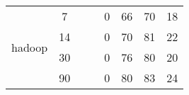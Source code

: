 \begin{wraptable}{r}{3in}
\begin{tabular}{c@{~}c|c@{~}c@{~}c|c@{~}c@{~}c}
\multirow{4}{*}{hadoop}                              & 7                                                    & \cellcolor[gray]{0.8}{0}         & \cellcolor[gray]{0.8}{0}       & 0       & 66         & 70       & 18      \\ \cline{2-2}
                              & 14                                                   & \cellcolor[gray]{0.8}{0}         & \cellcolor[gray]{0.8}{0}       & 0       & 70         & 81       & 22      \\ \cline{2-2}
                              & 30                                                   & \cellcolor[gray]{0.8}{0}         & \cellcolor[gray]{0.8}{0}       & 0       & 76         & 80       & 20      \\ \cline{2-2}
                              & 90                                                   & \cellcolor[gray]{0.8}{32}        & \cellcolor[gray]{0.8}{2}      & 0       & 80         & 83       & 24      \\ \hline

\end{tabular}
\end{wraptable}
